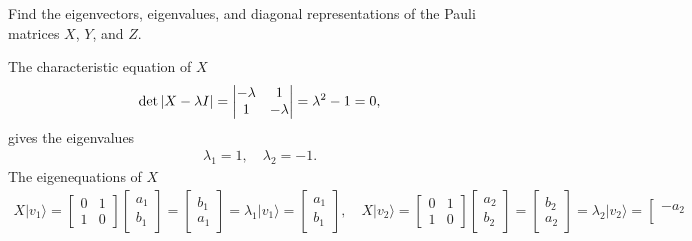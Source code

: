 \documentclass[en]{sol-man}
\begin{document}
\begin{exe}
    Find the eigenvectors, eigenvalues, and diagonal representations of the Pauli matrices $X$, $Y$, and $Z$.
\end{exe}
\begin{sol}
    The characteristic equation of $X$
    \begin{align}
        \det\left\lvert X-\lambda I\right\rvert=\left\lvert\begin{matrix}
            -\lambda&1\\
            1&-\lambda
        \end{matrix}\right\rvert=\lambda^2-1=0,
    \end{align}
    gives the eigenvalues
    \begin{align}
        \lambda_1=1,\quad\lambda_2=-1.
    \end{align}
    The eigenequations of $X$
    \begin{align}
        X\lvert v_1\rangle=\left[\begin{matrix}
            0&1\\
            1&0
        \end{matrix}\right]\left[\begin{matrix}
            a_1\\
            b_1
        \end{matrix}\right]=\left[\begin{matrix}
            b_1\\
            a_1
        \end{matrix}\right]=\lambda_1\lvert v_1\rangle=\left[\begin{matrix}
            a_1\\
            b_1
        \end{matrix}\right],\quad X\lvert v_2\rangle=\left[\begin{matrix}
            0&1\\
            1&0
        \end{matrix}\right]\left[\begin{matrix}
            a_2\\
            b_2
        \end{matrix}\right]=\left[\begin{matrix}
            b_2\\
            a_2
        \end{matrix}\right]=\lambda_2\lvert v_2\rangle=\left[\begin{matrix}
            -a_2\\

\end{matrix}
\end{align}
\end{sol}
\end{document}
